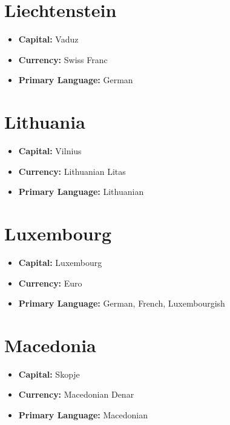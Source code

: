 \documentclass[a4paper,100pt,twoside]{book}
\begin{document}
\section*{\Huge Liechtenstein}
\vspace{5mm} %
\begin{itemize}
	\item \textbf{Capital:} Vaduz
	\item \textbf{Currency:} Swiss Franc
	\item \textbf{Primary Language:} German
\end{itemize}

\section*{\Huge Lithuania}
\vspace{5mm} %
\begin{itemize}
	\item \textbf{Capital:} Vilnius
	\item \textbf{Currency:} Lithuanian Litas
	\item \textbf{Primary Language:} Lithuanian
\end{itemize}

\section*{\Huge Luxembourg}
\vspace{5mm} %
\begin{itemize}
	\item \textbf{Capital:} Luxembourg
	\item \textbf{Currency:} Euro
	\item \textbf{Primary Language:} German, French, Luxembourgish
\end{itemize}

\section*{\Huge Macedonia}
\vspace{5mm} %
\begin{itemize}
	\item \textbf{Capital:} Skopje
	\item \textbf{Currency:} Macedonian Denar
	\item \textbf{Primary Language:} Macedonian
\end{itemize}
\end{document}
